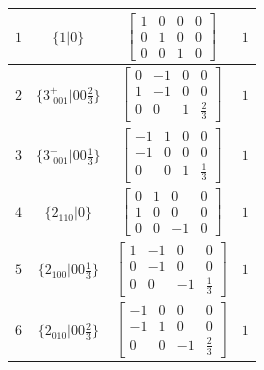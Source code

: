 \documentclass[fleqn,8pt]{jsarticle}
\begin{document}
\begin{longtable}{cccc}
$ 1 $ & $ \{1|0\} $ & $ \begin{bmatrix} 1 & 0 & 0 & 0 \\ 0 & 1 & 0 & 0 \\ 0 & 0 & 1 & 0 \end{bmatrix} $ & $ 1 $ \\ \hline
$ 2 $ & $ \{3^{+}_{\,\,001}|0 0 \frac{2}{3}\} $ & $ \begin{bmatrix} 0 & -1 & 0 & 0 \\ 1 & -1 & 0 & 0 \\ 0 & 0 & 1 & \frac{2}{3} \end{bmatrix} $ & $ 1 $ \\ \hline
$ 3 $ & $ \{3^{-}_{\,\,001}|0 0 \frac{1}{3}\} $ & $ \begin{bmatrix} -1 & 1 & 0 & 0 \\ -1 & 0 & 0 & 0 \\ 0 & 0 & 1 & \frac{1}{3} \end{bmatrix} $ & $ 1 $ \\ \hline
$ 4 $ & $ \{2{}_{110}|0\} $ & $ \begin{bmatrix} 0 & 1 & 0 & 0 \\ 1 & 0 & 0 & 0 \\ 0 & 0 & -1 & 0 \end{bmatrix} $ & $ 1 $ \\ \hline
$ 5 $ & $ \{2{}_{100}|0 0 \frac{1}{3}\} $ & $ \begin{bmatrix} 1 & -1 & 0 & 0 \\ 0 & -1 & 0 & 0 \\ 0 & 0 & -1 & \frac{1}{3} \end{bmatrix} $ & $ 1 $ \\ \hline
$ 6 $ & $ \{2{}_{010}|0 0 \frac{2}{3}\} $ & $ \begin{bmatrix} -1 & 0 & 0 & 0 \\ -1 & 1 & 0 & 0 \\ 0 & 0 & -1 & \frac{2}{3} \end{bmatrix} $ & $ 1 $ \\
\end{longtable}
\end{document}
